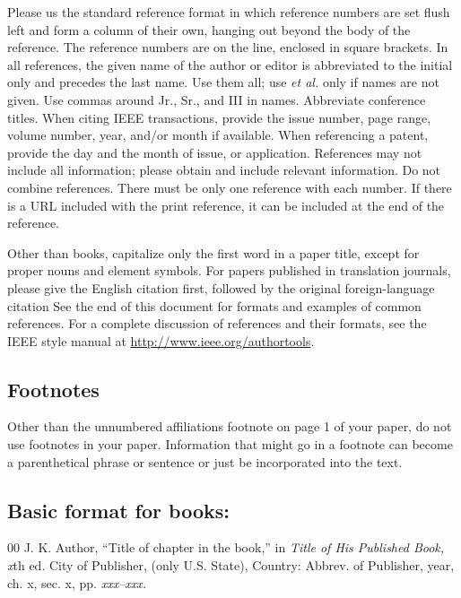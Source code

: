 \documentclass{IEEEtran}
\begin{document}
Please us the standard reference format in which
reference numbers are set flush left and form a column of their own, hanging
out beyond the body of the reference. The reference numbers are on the line,
enclosed in square brackets. In all references, the given name of the author
or editor is abbreviated to the initial only and precedes the last name. Use
them all; use \emph{et al.} only if names are not given. Use commas around Jr.,
Sr., and III in names. Abbreviate conference titles. When citing IEEE
transactions, provide the issue number, page range, volume number, year,
and/or month if available. When referencing a patent, provide the day and
the month of issue, or application. References may not include all
information; please obtain and include relevant information. Do not combine
references. There must be only one reference with each number. If there is a
URL included with the print reference, it can be included at the end of the
reference.

Other than books, capitalize only the first word in a paper title, except
for proper nouns and element symbols. For papers published in translation
journals, please give the English citation first, followed by the original
foreign-language citation See the end of this document for formats and
examples of common references. For a complete discussion of references and
their formats, see the IEEE style manual at
\underline{http://www.ieee.org/authortools}.

\subsection{Footnotes}
Other than the unnumbered affiliations footnote on page 1 of your paper, do
not use footnotes in your paper. Information that might go in a footnote can
become a parenthetical phrase or sentence or just be incorporated into the
text.





\def\refname{\vadjust{\vspace*{-1em}}} %

\subsection*{Basic format for books:}

\begin{thebibliography}{00}
 J. K. Author, ``Title of chapter in the book,'' in \textit{Title of His Published Book, x}th ed. City of Publisher,
(only U.S. State), Country: Abbrev. of Publisher, year, ch. x, sec. x, pp.
\textit{xxx--xxx.}
\end{thebibliography}
\end{document}
